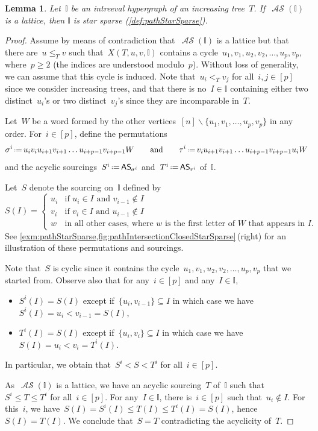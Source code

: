 \documentclass{amsart}
\newtheorem{lemma}[theorem]{Lemma}
\theoremstyle{definition}
\newcommand{\ssm}{\smallsetminus} %
\newcommand{\eqdef}{\mbox{\,\raisebox{0.2ex}{\scriptsize\ensuremath{\mathrm:}}\ensuremath{=}\,}} %
\newcommand{\mymap}[2]{\mathsf{#1}_{\hspace{-.7pt}#2}}
\DeclareMathOperator{\ASour}{\mathcal{AS}}  %
\newcommand{\asour}[1]{\mymap{AS}{#1}}  %
\newcommand{\II}{\mathbb I} %
\begin{document}
\begin{lemma}
\label{lem:pathStarSparse}
Let~$\II$ be an intreeval hypergraph of an increasing tree~$T$.
If~$\ASour(\II)$ is a lattice, then $\II$ is star sparse (\cref{def:pathStarSparse}).
\end{lemma}

\begin{proof}
Assume by means of contradiction that~$\ASour(\II)$ is a lattice but that there are~$u \le_T v$ such that~$X(T,u,v,\II)$ contains a cycle~$u_1, v_1, u_2, v_2, \dots, u_p, v_p$, where~$p \ge 2$ (the indices are understood modulo~$p$).
Without loss of generality, we can assume that this cycle is induced.
Note that~$u_i <_T v_j$ for all~$i,j \in [p]$ since we consider increasing trees, and that there is no~$I \in \II$ containing either two distinct~$u_i$'s or two distinct~$v_j$'s since they are incomparable in~$T$.

Let~$W$ be a word formed by the other vertices~$[n] \ssm \{u_1, v_1, \dots, u_p, v_p\}$ in any order.
For~$i \in [p]$, define the permutations
\[
\sigma^i \eqdef u_i v_i u_{i+1} v_{i+1} \dots u_{i+p-1} v_{i+p-1} W
\qquad\text{and}\qquad
\tau^i \eqdef v_i u_{i+1} v_{i+1} \dots u_{i+p-1} v_{i+p-1} u_i W
\]
and the acyclic sourcings~$S^i \eqdef \asour{\sigma^i}$ and~$T^i \eqdef \asour{\tau^i}$ of~$\II$.

Let~$S$ denote the sourcing on~$\II$ defined by
\[
S(I) = 
\begin{cases}
	u_i & \text{if~$u_i \in I$ and~$v_{i-1} \notin I$} \\
	v_i & \text{if~$v_i \in I$ and~$u_{i-1} \notin I$} \\
	w & \text{in all other cases, where~$w$ is the first letter of~$W$ that appears in~$I$}.
\end{cases}
\]
See \cref{exm:pathStarSparse,fig:pathIntersectionClosedStarSparse}\,(right) for an illustration of these permutations and sourcings.

Note that~$S$ is cyclic since it contains the cycle~$u_1, v_1, u_2, v_2, \dots, u_p, v_p$ that we started from.
Observe also that for any~$i \in [p]$ and any~$I \in \II$,
\begin{itemize}
\item $S^i(I) = S(I)$ except if~$\{u_i, v_{i-1}\} \subseteq I$ in which case we have~$S^i(I) = u_i < v_{i-1} = S(I)$,
\item $T^i(I) = S(I)$ except if~$\{u_i, v_i\} \subseteq I$ in which case we have~$S(I) = u_i < v_i = T^i(I)$.
\end{itemize}
In particular, we obtain that~$S^i < S < T^i$ for all~$i \in [p]$.

As~$\ASour(\II)$ is a lattice, we have an acyclic sourcing~$T$ of~$\II$ such that~$S^i \le T \le T^i$ for all~$i \in [p]$.
For any~$I \in \II$, there is~$i \in [p]$ such that~$u_i \notin I$.
For this~$i$, we have~$S(I) = S^i(I) \le T(I) \le T^i(I) = S(I)$, hence~$S(I) = T(I)$.
We conclude that~$S = T$ contradicting the acyclicity of~$T$.
\end{proof}
\end{document}
